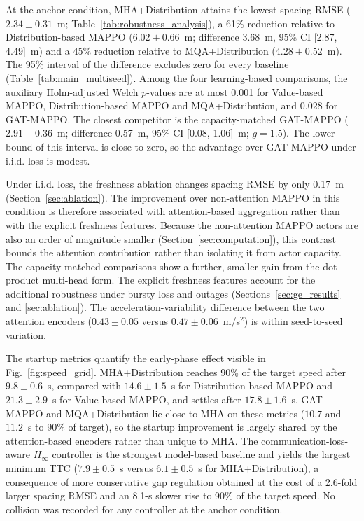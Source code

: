 \documentclass{ieeeaccess}
\begin{document}
At the anchor condition, MHA+Distribution attains the lowest spacing RMSE ($2.34\pm0.31$~m; Table~\ref{tab:robustness_analysis}), a 61\% reduction relative to Distribution-based MAPPO ($6.02\pm0.66$~m; difference 3.68~m, 95\% CI [2.87, 4.49]~m) and a 45\% reduction relative to MQA+Distribution ($4.28\pm0.52$~m). The 95\% interval of the difference excludes zero for every baseline (Table~\ref{tab:main_multiseed}). Among the four learning-based comparisons, the auxiliary Holm-adjusted Welch $p$-values are at most 0.001 for Value-based MAPPO, Distribution-based MAPPO and MQA+Distribution, and 0.028 for GAT-MAPPO. The closest competitor is the capacity-matched GAT-MAPPO ($2.91\pm0.36$~m; difference 0.57~m, 95\% CI [0.08, 1.06]~m; $g=1.5$). The lower bound of this interval is close to zero, so the advantage over GAT-MAPPO under i.i.d. loss is modest. %

Under i.i.d. loss, the freshness ablation changes spacing RMSE by only 0.17~m (Section~\ref{sec:ablation}). The improvement over non-attention MAPPO in this condition is therefore associated with attention-based aggregation rather than with the explicit freshness features. Because the non-attention MAPPO actors are also an order of magnitude smaller (Section~\ref{sec:computation}), this contrast bounds the attention contribution rather than isolating it from actor capacity. The capacity-matched comparisons show a further, smaller gain from the dot-product multi-head form. The explicit freshness features account for the additional robustness under bursty loss and outages (Sections~\ref{sec:ge_results} and \ref{sec:ablation}). The acceleration-variability difference between the two attention encoders ($0.43\pm0.05$ versus $0.47\pm0.06$~m/s$^2$) is within seed-to-seed variation. %

The startup metrics quantify the early-phase effect visible in Fig.~\ref{fig:speed_grid}. MHA+Distribution reaches 90\% of the target speed after $9.8\pm0.6$~s, compared with $14.6\pm1.5$~s for Distribution-based MAPPO and $21.3\pm2.9$~s for Value-based MAPPO, and settles after $17.8\pm1.6$~s. GAT-MAPPO and MQA+Distribution lie close to MHA on these metrics ($10.7$ and $11.2$~s to 90\% of target), so the startup improvement is largely shared by the attention-based encoders rather than unique to MHA. The communication-loss-aware $H_\infty$ controller is the strongest model-based baseline and yields the largest minimum TTC ($7.9\pm0.5$~s versus $6.1\pm0.5$~s for MHA+Distribution), a consequence of more conservative gap regulation obtained at the cost of a 2.6-fold larger spacing RMSE and an 8.1-s slower rise to 90\% of the target speed. No collision was recorded for any controller at the anchor condition. %
\end{document}
